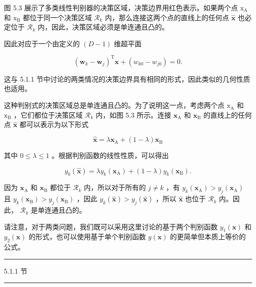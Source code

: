 \documentclass[10pt]{report}
\newcommand{\HRule}{\begin{center}\rule{0.9\linewidth}{0.2mm}\end{center}}
\begin{document}
图 5.3 展示了多类线性判别器的决策区域，决策边界用红色表示。如果两个点 \({\mathrm{x}}_{\mathrm{A}}\) 和 \({\mathrm{x}}_{\mathrm{B}}\) 都位于同一个决策区域 \({\mathcal{R}}_{k}\) 内，那么连接这两个点的直线上的任何点 \(\widehat{\mathbf{x}}\) 也必定位于 \({\mathcal{R}}_{k}\) 内，因此，决策区域必须是单连通且凸的。

因此对应于一个由定义的 \(\left( {D - 1}\right)\) 维超平面

\[
{\left( {\mathbf{w}}_{k} - {\mathbf{w}}_{j}\right) }^{\mathrm{T}}\mathbf{x} + \left( {{w}_{k0} - {w}_{j0}}\right)  = 0. \tag{5.8}
\]

这与 5.1.1 节中讨论的两类情况的决策边界具有相同的形式，因此类似的几何性质也适用。

这种判别式的决策区域总是单连通且凸的。为了说明这一点，考虑两个点 \({\mathrm{x}}_{\mathrm{A}}\) 和 \({\mathrm{x}}_{\mathrm{B}}\) ，它们都位于决策区域 \({\mathcal{R}}_{k}\) 内，如图 5.3 所示。连接 \({\mathbf{x}}_{\mathrm{A}}\) 和 \({\mathbf{x}}_{\mathrm{B}}\) 的直线上的任何点 \(\widehat{\mathbf{x}}\) 都可以表示为以下形式

\[
\widehat{\mathbf{x}} = \lambda {\mathbf{x}}_{\mathrm{A}} + \left( {1 - \lambda }\right) {\mathbf{x}}_{\mathrm{B}} \tag{5.9}
\]

其中 \(0 \leq  \lambda  \leq  1\) 。根据判别函数的线性性质，可以得出

\[
{y}_{k}\left( \widehat{\mathbf{x}}\right)  = \lambda {y}_{k}\left( {\mathbf{x}}_{\mathrm{A}}\right)  + \left( {1 - \lambda }\right) {y}_{k}\left( {\mathbf{x}}_{\mathrm{B}}\right) . \tag{5.10}
\]

因为 \({\mathbf{x}}_{\mathrm{A}}\) 和 \({\mathbf{x}}_{\mathrm{B}}\) 都位于 \({\mathcal{R}}_{k}\) 内，所以对于所有的 \(j \neq  k\) ，有 \({y}_{k}\left( {\mathbf{x}}_{\mathrm{A}}\right)  > {y}_{j}\left( {\mathbf{x}}_{\mathrm{A}}\right)\) 且 \({y}_{k}\left( {\mathbf{x}}_{\mathrm{B}}\right)  > {y}_{j}\left( {\mathbf{x}}_{\mathrm{B}}\right)\) ，因此 \({y}_{k}\left( \widehat{\mathbf{x}}\right)  > {y}_{j}\left( \widehat{\mathbf{x}}\right)\) ，所以 \(\widehat{\mathbf{x}}\) 也位于 \({\mathcal{R}}_{k}\) 内。因此， \({\mathcal{R}}_{k}\) 是单连通且凸的。

请注意，对于两类问题，我们既可以采用这里讨论的基于两个判别函数 \({y}_{1}\left( \mathbf{x}\right)\) 和 \({y}_{2}\left( \mathbf{x}\right)\) 的形式，也可以使用基于单个判别函数 \(y\left( \mathbf{x}\right)\) 的更简单但本质上等价的公式。

\HRule

5.1.1 节

\HRule
\end{document}

